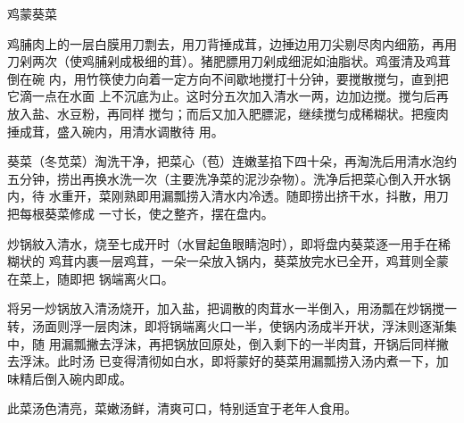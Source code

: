 \begin{recipe}{鸡蒙葵菜}

\ingredients


\preparation

\step 鸡脯肉上的一层白膜用刀剽去，用刀背捶成茸，边捶边用刀尖剔尽肉内细筋，再用
刀剁两次（使鸡脯剁成极细的茸）。猪肥膘用刀剁成细泥如油脂状。鸡蛋清及鸡茸倒在碗
内，用竹筷使力向着一定方向不间歇地搅打十分钟，要搅散搅匀，直到把它滴一点在水面
上不沉底为止。这时分五次加入清水一两，边加边搅。搅匀后再放入盐、水豆粉，再同样
搅匀；而后又加入肥膘泥，继续搅匀成稀糊状。把瘦肉捶成茸，盛入碗内，用清水调散待
用。

\step 葵菜（冬苋菜）淘洗干净，把菜心（苞）连嫩茎掐下四十朵，再淘洗后用清水泡约
五分钟，捞出再换水洗一次（主要洗净菜的泥沙杂物）。洗净后把菜心倒入开水锅内，待
水重开，菜刚熟即用漏瓢捞入清水内冷透。随即捞出挤干水，抖散，用刀把每根葵菜修成
一寸长，使之整齐，摆在盘内。

炒锅紋入清水，烧至七成开时（水冒起鱼眼睛泡时），即将盘内葵菜逐一用手在稀糊状的
鸡茸内裹一层鸡茸，一朵一朵放入锅内，葵菜放完水已全开，鸡茸则全蒙在菜上，随即把
锅端离火口。

\step 将另一炒锅放入清汤烧开，加入盐，把调散的肉茸水一半倒入，用汤瓢在炒锅搅一
转，汤面则浮一层肉沫，即将锅端离火口一半，使锅内汤成半开状，浮沬则逐渐集中，随
用漏瓢撇去浮沫，再把锅放回原处，倒入剩下的一半肉茸，开锅后同样撇去浮沫。此时汤
已变得清彻如白水，即将蒙好的葵菜用漏瓢捞入汤内煮一下，加味精后倒入碗内即成。

\features

此菜汤色清亮，菜嫩汤鲜，清爽可口，特别适宜于老年人食用。

\end{recipe}

